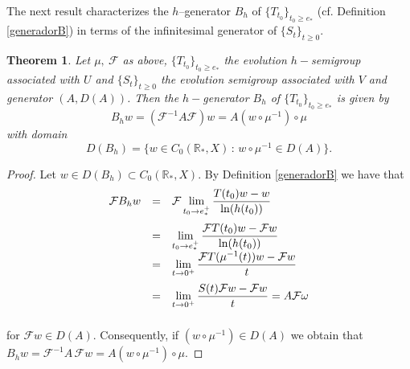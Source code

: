 \documentclass[10pt]{amsart}
\newtheorem{theorem}{Theorem}
\numberwithin{equation}{section}
\begin{document}
\medskip


The next result characterizes the $h$--generator $B_{h}$ of $\{T_{t_{0}}\}_{t_{0}\geq e_{*}}$ (cf. Definition \ref{generadorB}) in terms of the infinitesimal
generator of $\{S_{t}\}_{t\geq 0}$.

\begin{theorem}\label{AgenB}
  Let $\mu, \ \mathcal{F}$ as above, $\{T_{t_0}\}_{t_0 \ge e_*}$ the evolution $h-$semigroup associated with $U$ and $\{S_t\}_{t \ge 0}$ the evolution semigroup associated with $V$ and generator $(A,D(A))$.
  Then the $h-$generator $B_h$ of $\{T_{t_0}\}_{t_0 \ge e_*}$ is given by
\begin{equation}\label{GenerSem}
B_hw = (\mathcal{F}^{-1} A \mathcal{F}) w = A (w \circ \mu^{-1}) \circ \mu
\end{equation}
with domain 
$$
D(B_h) = \displaystyle  \{w \in C_0(\mathbb{R}_*, X) \, : \, w \circ \mu^{-1} \in D(A)\}.
$$

  \end{theorem}

\begin{proof} Let $w \in D(B_h) \subset C_0(\mathbb{R}_*, X).$ By Definition \ref{generadorB} we have that 
$$
\begin{array}{rcl}
\medskip 
\mathcal{F}B_hw  & = & \displaystyle\mathcal{F}  \lim_{t_0 \to e_*^+} \frac{T(t_0) w - w}{\ln(h(t_0))} \\
& = & \displaystyle \lim_{t_0 \to e_*^+} \frac{\mathcal{F}T(t_0) w -\mathcal{F} w}{\ln(h(t_0))}   \\
\medskip
& = & \displaystyle  \lim_{t \to 0^+} \frac{\mathcal{F} T(\mu^{-1}(t)) w -\mathcal{F} w}{t} \\
\medskip
& = & \displaystyle  \lim_{t \to 0^+} \frac{S(t) \mathcal{F} w - \mathcal{F} w}{t} = A \mathcal{F} \omega\\
\end{array}
$$



\noindent for $ \mathcal{F}w \in D(A).$  Consequently, if $(w \circ \mu^{-1}) \in D(A)$ we obtain that $B_h  w  = \mathcal{F}^{-1} A \, \mathcal{F} w = A (w \circ \mu^{-1}) \circ \mu.$

\end{proof}
\end{document}
